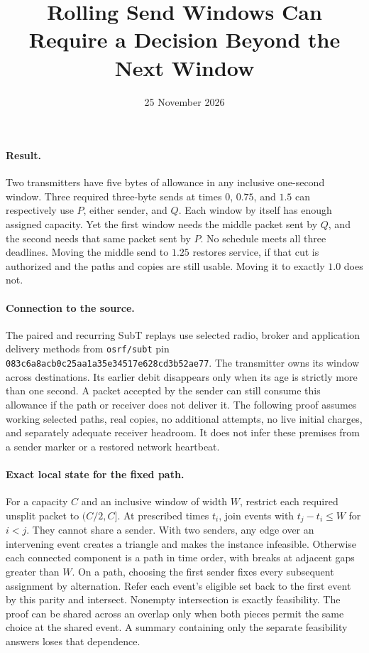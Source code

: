 \documentclass[11pt]{article}
\title{Rolling Send Windows Can Require a Decision Beyond the Next Window}
\date{25 November 2026}
\begin{document}
\maketitle
\paragraph{Result.}
Two transmitters have five bytes of allowance in any inclusive
one-second window. Three required three-byte sends at times $0$,
$0.75$, and $1.5$ can respectively use $P$, either sender, and $Q$.
Each window by itself has enough assigned capacity. Yet the first
window needs the middle packet sent by $Q$, and the second needs
that same packet sent by $P$. No schedule meets all three deadlines.
Moving the middle send to $1.25$ restores service, if that cut is
authorized and the paths and copies are still usable. Moving it to
exactly $1.0$ does not.

\paragraph{Connection to the source.}
The paired and recurring SubT replays use selected radio, broker and
application delivery methods from \texttt{osrf/subt} pin
\texttt{083c6a8acb0c25aa1a35e34517e628cd3b52ae77}. The transmitter
owns its window across destinations. Its earlier debit disappears only
when its age is strictly more than one second. A packet accepted by
the sender can still consume this allowance if the path or receiver
does not deliver it. The following proof assumes working selected
paths, real copies, no additional attempts, no live initial charges,
and separately adequate receiver headroom. It does not infer these
premises from a sender marker or a restored network heartbeat.

\paragraph{Exact local state for the fixed path.}
For a capacity $C$ and an inclusive window of width $W$, restrict each
required unsplit packet to $(C/2,C]$. At prescribed times $t_i$,
join events with $t_j-t_i\le W$ for $i<j$. They cannot share a
sender. With two senders, any edge over an intervening event
creates a triangle and makes the instance infeasible. Otherwise
each connected component is a path in time order, with breaks
at adjacent gaps greater than $W$. On a path, choosing the first
sender fixes every subsequent assignment by alternation. Refer
each event's eligible set back to the first event by this parity
and intersect. Nonempty intersection is exactly feasibility.
The proof can be shared across an overlap only when both pieces
permit the same choice at the shared event. A summary containing
only the separate feasibility answers loses that dependence.
\end{document}
